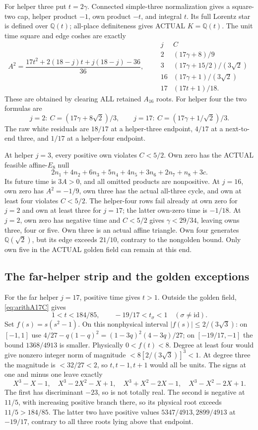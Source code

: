 \documentclass[11pt]{article}
\begin{document}
For helper three put \(t=2\gamma\).
Connected simple-three normalization gives a square-two cap,
helper product \(-1\), own product \(-t\), and integral \(t\).
Its full Lorentz star is defined over \(\mathbb Q(t)\);
all-place definiteness gives ACTUAL \(K=\mathbb Q(t)\).
The unit time square and edge coshes are exactly
\[
 A^2={\frac{17t^2+2(18-j)t+j(18-j)-36}{36}},
\qquad
\begin{array}{c|c}
j&C\\ \hline
2&(17\gamma+8)/9\\
3&(17\gamma+15/2)/(3\sqrt2)\\
16&(17\gamma+1)/(3\sqrt2)\\
17&(17t+1)/18 .
\end{array}
\]
These are obtained by clearing ALL retained \(A_{16}\) roots.
For helper four the two formulas are
\[
 j=2:\ C=(17\gamma+8\sqrt2)/3,\qquad
 j=17:\ C=(17\gamma+1/\sqrt2)/3 .
\]
The raw white residuals are \(18/17\) at a helper-three
endpoint, \(4/17\) at a next-to-end three, and \(1/17\)
at a helper-four endpoint.

At helper \(j=3\), every positive own violates \(C<5/2\).
Own zero has the ACTUAL feasible affine-\(E_8\) null
\[
 2n_1+4n_2+6n_3+5n_4+4n_5+3n_6+2n_7+n_8+3c .
\]
Its future time is \(3A>0\), and all omitted products are
nonpositive.
At \(j=16\), own zero has \(A^2=-1/9\), own three has
the actual all-three cycle, and own at least four violates
\(C<5/2\).
The helper-four rows fail already at own zero for \(j=2\)
and own at least three for \(j=17\); the latter own-zero
time is \(-1/18\).
At \(j=2\), own zero has negative time and
\(C<5/2\) gives \(\gamma<29/34\), leaving owns three,
four or five.
Own three is an actual affine triangle.
Own four generates \(\mathbb Q(\sqrt2)\), but its edge exceeds
\(21/10\), contrary to the nongolden bound.
Only own five in the ACTUAL golden field can remain at this end.

\subsection{The far-helper strip and the golden exceptions}
\label{app:arithA17goldenends}

For the far helper \(j=17\), positive time gives \(t>1\).
Outside the golden field, \eqref{eq:arithA17C} gives
\[
 1<t<184/85,\qquad -19/17<t_\sigma<1\quad(\sigma\ne\mathrm{id}).
\]
Set \(f(s)=s(s^2-1)\).
On this nonphysical interval
\(\lvert f(s)\rvert\le2/(3\sqrt3)\):
on \([-1,1]\) use
\(4/27-q(1-q)^2=(1-3q)^2(4-3q)/27\);
on \([-19/17,-1]\) the bound \(1368/4913\) is smaller.
Physically \(0<f(t)<8\).
Degree at least four would give nonzero integer norm of
magnitude \(<8[2/(3\sqrt3)]^3<1\).
At degree three the magnitude is \(<32/27<2\), so
\(t,t-1,t+1\) would all be units.
The signs at one and minus one leave exactly
\[
 X^3-X-1,\quad X^3-2X^2-X+1,\quad
 X^3+X^2-2X-1,\quad X^3-X^2-2X+1 .
\]
The first has discriminant \(-23\), so is not totally real.
The second is negative at \(11/5\), with increasing positive
branch there, so its physical root exceeds \(11/5>184/85\).
The latter two have positive values \(5347/4913,2899/4913\)
at \(-19/17\), contrary to all three roots lying above that
endpoint.
\end{document}
